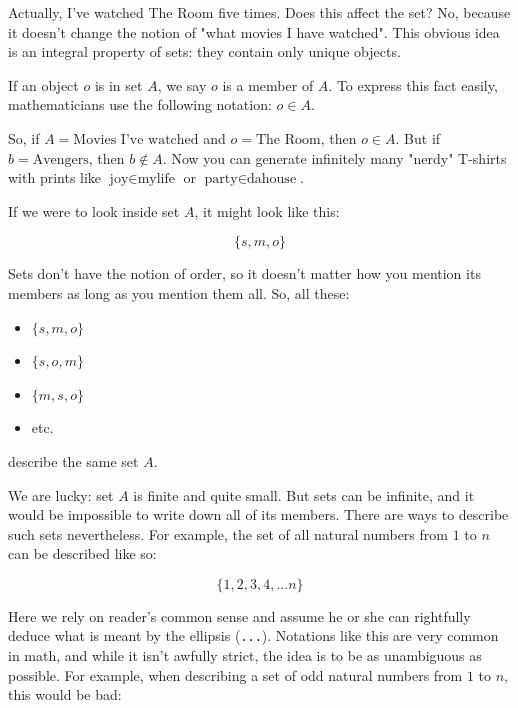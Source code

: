 \documentclass[a4paper, justified, notitlepage, sfsidenotes, notoc]{tufte-book}
\begin{document}
Actually, I've watched The Room five times. Does this affect the set? No, because it doesn't change the notion of "what movies I have watched". This obvious idea is an integral property of sets: they contain only unique objects.



If an object \(o\) is in set \(A\), we say \(o\) is a member of \(A\). To express this fact easily, mathematicians use the following notation: \(o \in A\).

So, if \(A = \textrm{Movies I've watched}\) and \(o = \textrm{The Room}\), then \(o \in A\). But if \(b = \textrm{Avengers}\),  then \(b \notin A\). Now you can generate infinitely many "nerdy" T-shirts with prints like \(\textrm{joy} \in \textrm{mylife}\) or \(\textrm{party} \in \textrm{dahouse}\).

If we were to look inside set \(A\), it might look like this:

\begin{equation}
\{s, m, o\}
\end{equation}

Sets don't have the notion of order, so it doesn't matter how you mention its members as long as you mention them all. So, all these:

\begin{itemize}
\item \(\{s, m, o\}\)
\item \(\{s, o, m\}\)
\item \(\{m, s, o\}\)
\item etc.
\end{itemize}

describe the same set \(A\).

We are lucky: set \(A\) is finite and quite small. But sets can be infinite, and it would be impossible to write down all of its members. There are ways to describe such sets nevertheless. For example, the set of all natural numbers from \(1\) to \(n\) can be described like so:

\begin{equation}
\{1, 2, 3, 4, ... n\}
\end{equation}

Here we rely on reader's common sense and assume he or she can rightfully deduce what is meant by the ellipsis (\texttt{...}). Notations like this are very common in math, and while it isn't awfully strict, the idea is to be as unambiguous as possible. For example, when describing a set of odd natural numbers from \(1\) to \(n\), this would be bad:
\end{document}
